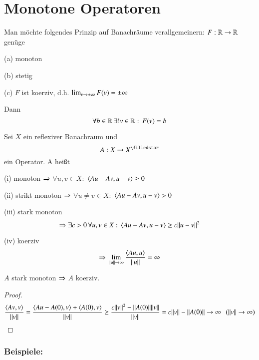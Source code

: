 \section{Monotone Operatoren}

Man möchte folgendes Prinzip auf Banachräume verallgemeinern: $F:\mathbb{R}\rightarrow\mathbb{R}$ genüge
\begin{description}
    \item{(a)}
    monoton
    \item{(b)}
    stetig
    \item{(c)}
    $F$ ist koerziv, d.h. $\lim_{v\rightarrow \pm \infty} F(v)=\pm \infty$
\end{description}
Dann
\[
    \forall b\in \mathbb{R} \, \exists ! v\in \mathbb{R}: \, F(v)=b
\]

\begin{defi}\label{4.1}
    Sei $X$ ein reflexiver Banachraum und
    \[
        A:X\ra X^\star
    \]
    ein Operator. A heißt
    \begin{description}
        \item{(i)}
        monoton $\Rightarrow$ $\forall u,v\in X:$ $\langle Au-Av,u-v\rangle\geq 0$
        \item{(ii)}
        strikt monoton $\Rightarrow$ $\forall u\neq v\in X:$ $\langle Au-Av,u-v\rangle>0$
        \item{(iii)}
        stark monoton
        \[
            \Rightarrow \exists c>0 \, \forall u,v\in X:\, \langle Au-Av,u-v\rangle\geq c\|u-v\|^2
        \]
        \item{(iv)}
        koerziv
        \[
            \Rightarrow \, \lim_{\|u\|\rightarrow \infty}\frac{ \langle Au,u\rangle }{\|u\|}=\infty
        \]
    \end{description}
\end{defi}

\begin{remark}
    $A$ stark monoton $\Rightarrow$ $A$ koerziv.
\end{remark}

\begin{proof}
    \[
        \frac{\langle Av,v\rangle}{\|v\|}=\frac{ \langle Au-A(0), v\rangle + \langle A(0),v\rangle }{\|v\|}
        \geq \frac{c\|v\|^2 - \|A(0)\|\|v\|}{\|v\|} = c\|v\| - \|A(0)\|\rightarrow \infty \hspace{.25cm} (\|v\|\rightarrow \infty)
    \]
\end{proof}

\subsubsection*{Beispiele:}

